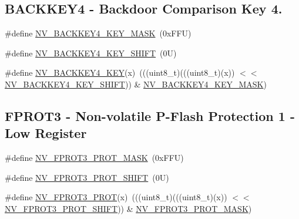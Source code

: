 \subsection*{B\+A\+C\+K\+K\+E\+Y4 -\/ Backdoor Comparison Key 4.}
\begin{DoxyCompactItemize}
\item 
\#define \mbox{\hyperlink{group___n_v___register___masks_ga49a74f76cf8b7787284ac6e510e4e0c3}{N\+V\+\_\+\+B\+A\+C\+K\+K\+E\+Y4\+\_\+\+K\+E\+Y\+\_\+\+M\+A\+SK}}~(0x\+F\+F\+U)
\item 
\#define \mbox{\hyperlink{group___n_v___register___masks_gadfa9b097c522673010b11e94a5a7b9eb}{N\+V\+\_\+\+B\+A\+C\+K\+K\+E\+Y4\+\_\+\+K\+E\+Y\+\_\+\+S\+H\+I\+FT}}~(0\+U)
\item 
\#define \mbox{\hyperlink{group___n_v___register___masks_gaec4a23e778980f71beab56e3353a0abb}{N\+V\+\_\+\+B\+A\+C\+K\+K\+E\+Y4\+\_\+\+K\+EY}}(x)~(((uint8\+\_\+t)(((uint8\+\_\+t)(x)) $<$$<$ \mbox{\hyperlink{group___n_v___register___masks_gadfa9b097c522673010b11e94a5a7b9eb}{N\+V\+\_\+\+B\+A\+C\+K\+K\+E\+Y4\+\_\+\+K\+E\+Y\+\_\+\+S\+H\+I\+FT}})) \& \mbox{\hyperlink{group___n_v___register___masks_ga49a74f76cf8b7787284ac6e510e4e0c3}{N\+V\+\_\+\+B\+A\+C\+K\+K\+E\+Y4\+\_\+\+K\+E\+Y\+\_\+\+M\+A\+SK}})
\end{DoxyCompactItemize}
\subsection*{F\+P\+R\+O\+T3 -\/ Non-\/volatile P-\/\+Flash Protection 1 -\/ Low Register}
\begin{DoxyCompactItemize}
\item 
\#define \mbox{\hyperlink{group___n_v___register___masks_ga1a2ecc3ba1f6ae4c2db7fcaa8f369b34}{N\+V\+\_\+\+F\+P\+R\+O\+T3\+\_\+\+P\+R\+O\+T\+\_\+\+M\+A\+SK}}~(0x\+F\+F\+U)
\item 
\#define \mbox{\hyperlink{group___n_v___register___masks_gaee74e224c0572f7618f28c11d921b6e3}{N\+V\+\_\+\+F\+P\+R\+O\+T3\+\_\+\+P\+R\+O\+T\+\_\+\+S\+H\+I\+FT}}~(0\+U)
\item 
\#define \mbox{\hyperlink{group___n_v___register___masks_ga67cd7aad5307a5ee8de3a2dd16c6315c}{N\+V\+\_\+\+F\+P\+R\+O\+T3\+\_\+\+P\+R\+OT}}(x)~(((uint8\+\_\+t)(((uint8\+\_\+t)(x)) $<$$<$ \mbox{\hyperlink{group___n_v___register___masks_gaee74e224c0572f7618f28c11d921b6e3}{N\+V\+\_\+\+F\+P\+R\+O\+T3\+\_\+\+P\+R\+O\+T\+\_\+\+S\+H\+I\+FT}})) \& \mbox{\hyperlink{group___n_v___register___masks_ga1a2ecc3ba1f6ae4c2db7fcaa8f369b34}{N\+V\+\_\+\+F\+P\+R\+O\+T3\+\_\+\+P\+R\+O\+T\+\_\+\+M\+A\+SK}})
\end{DoxyCompactItemize}
